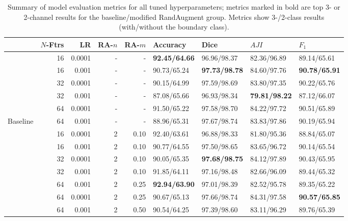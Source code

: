 \begin{table}
    \caption{Summary of model evaluation metrics for all tuned hyperparameters; metrics marked in bold are top 3- or 2-channel results for the baseline/modified RandAugment group. Metrics show 3-/2-class results (with/without the boundary class).}
    \label{tab:main}
    \begin{tabular}{l|rr|rr|llll}
    \toprule
    & $N$-Ftrs & LR & RA-$n$ & RA-$m$ & Accuracy & Dice & $AJI$ & $F_1$ \\
    \midrule
                & 16 & 0.0001    & - & - & \textbf{92.45/64.66}  & 96.96/98.37   & 82.36/96.89    & 89.14/65.61 \\
                & 16 & 0.001     & - & - & 90.73/65.24  & \textbf{97.73/98.78}   & 84.60/97.76     & \textbf{90.78/65.91} \\
                & 32 & 0.0001    & - & - & 90.15/64.99  & 97.59/98.69   & 83.80/97.35     & 90.22/65.76 \\
                & 32 & 0.001     & - & - & 87.08/65.66  & 96.93/98.34   & \textbf{79.81/98.22}    & 87.12/66.07 \\
                & 64 & 0.0001    & - & - & 91.50/65.22  & 97.58/98.70   & 84.22/97.72    & 90.51/65.89 \\
    Baseline    & 64 & 0.001     & - & - & 88.96/65.31  & 97.67/98.74   & 83.83/97.86    & 90.19/65.94 \\
    \midrule
                & 16    & 0.0001    & 2  & 0.10     & 92.40/63.61   & 96.88/98.33    & 81.80/95.36   & 88.84/65.07   \\
                & 16    & 0.001     & 2  & 0.10     & 90.77/64.55   & 97.50/98.65    & 83.65/96.72   & 90.14/65.54   \\
                & 32    & 0.0001    & 2  & 0.10     & 90.05/65.35   & \textbf{97.68/98.75}    & 84.12/97.89   & 90.43/65.95   \\
                & 32    & 0.001     & 2  & 0.10      & 91.85/64.11   & 97.16/98.48    & 82.66/96.09   & 89.44/65.32 \\
                & 64    & 0.001     & 2  & 0.25     & \textbf{92.94/63.90}   & 97.01/98.39    & 82.52/95.78   & 89.35/65.22   \\
                & 64    & 0.0001    & 2  & 0.25     & 90.67/65.13   & 97.66/98.74    & 84.31/97.58   & \textbf{90.57/65.85}   \\
                & 64    & 0.001     & 2  & 0.50     & 90.54/64.25   & 97.39/98.60    & 83.11/96.29   & 89.76/65.39   \\

\end{tabular}
\end{table}

